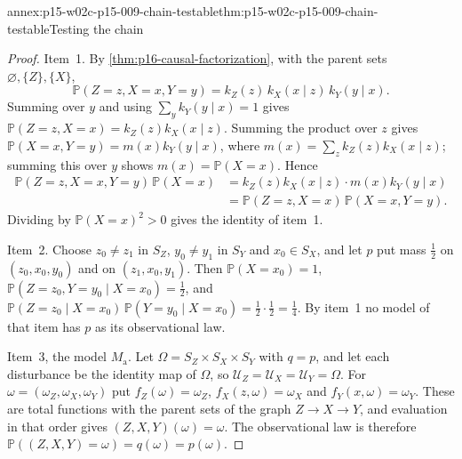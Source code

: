 \begin{annexitem}{annex:p15-w02c-p15-009-chain-testable}{thm:p15-w02c-p15-009-chain-testable}{Testing the chain}
\begin{proof}
Item~1. By \cref{thm:p16-causal-factorization}, with the parent sets
\(\varnothing,\{Z\},\{X\}\),
\[
 \mathbb P(Z=z,X=x,Y=y)=k_Z(z)\,k_X(x\mid z)\,k_Y(y\mid x).
\]
Summing over \(y\) and using \(\sum_yk_Y(y\mid x)=1\) gives
\(\mathbb P(Z=z,X=x)=k_Z(z)k_X(x\mid z)\). Summing the product over
\(z\) gives \(\mathbb P(X=x,Y=y)=m(x)k_Y(y\mid x)\), where
\(m(x)=\sum_zk_Z(z)k_X(x\mid z)\); summing this over \(y\) shows
\(m(x)=\mathbb P(X=x)\). Hence
\[
\begin{aligned}
 \mathbb P(Z=z,X=x,Y=y)\,\mathbb P(X=x)
 &=k_Z(z)k_X(x\mid z)\cdot m(x)k_Y(y\mid x)\\
 &=\mathbb P(Z=z,X=x)\,\mathbb P(X=x,Y=y).
\end{aligned}
\]
Dividing by \(\mathbb P(X=x)^2>0\) gives the identity of item~1.

Item~2. Choose \(z_0\ne z_1\) in \(S_Z\), \(y_0\ne y_1\) in \(S_Y\)
and \(x_0\in S_X\), and let \(p\) put mass \(\tfrac12\) on
\((z_0,x_0,y_0)\) and on \((z_1,x_0,y_1)\). Then
\(\mathbb P(X=x_0)=1\),
\(\mathbb P(Z=z_0,Y=y_0\mid X=x_0)=\tfrac12\), and
\(\mathbb P(Z=z_0\mid X=x_0)\,\mathbb P(Y=y_0\mid X=x_0)
=\tfrac12\cdot\tfrac12=\tfrac14\). By item~1 no model of that item has
\(p\) as its observational law.

Item~3, the model \(M_{\mathrm a}\). Let
\(\Omega=S_Z\times S_X\times S_Y\) with \(q=p\), and let each
disturbance be the identity map of \(\Omega\), so
\(\mathcal U_Z=\mathcal U_X=\mathcal U_Y=\Omega\). For
\(\omega=(\omega_Z,\omega_X,\omega_Y)\) put
\(f_Z(\omega)=\omega_Z\), \(f_X(z,\omega)=\omega_X\) and
\(f_Y(x,\omega)=\omega_Y\). These are total functions with the parent
sets of the graph \(Z\to X\to Y\), and evaluation in that order gives
\((Z,X,Y)(\omega)=\omega\). The observational law is therefore
\(\mathbb P((Z,X,Y)=\omega)=q(\omega)=p(\omega)\).


\end{proof}
\end{annexitem}
